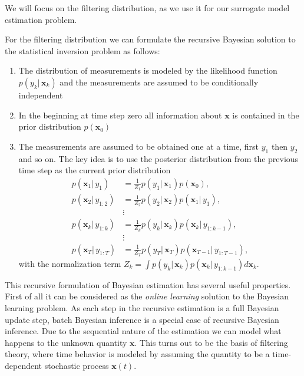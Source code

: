 
We will focus on the filtering distribution,
as we use it for our surrogate model estimation problem.

For the filtering distribution we can formulate the recursive Bayesian
solution to the statistical inversion problem as follows:
\begin{enumerate}
\item The distribution of measurements is modeled by the likelihood
  function $p(y_k |\, \mathbf{x}_k)$ and the measurements are assumed
  to be conditionally independent
\item In the beginning at time step zero all information about $\mathbf{x}$
  is contained in the prior distribution $p(\mathbf{x}_0)$
\item The measurements are assumed to be obtained one at a time,
  first $y_1$ then $y_2$ and so on. The key idea is to use the posterior
  distribution from the previous time step as the current prior
  distribution
  \begin{align*}
    p(\mathbf{x}_1 |\, y_{1})
    &= \frac{1}{Z_1} p(y_1 |\, \mathbf{x}_1) p(\mathbf{x}_0), \\
    p(\mathbf{x}_2 |\, y_{1:2})
    &= \frac{1}{Z_2} p(y_2 |\, \mathbf{x}_2) p(\mathbf{x}_1 |\, y_1), \\
                            &\vdots \\
    p(\mathbf{x}_k |\, y_{1:k})
    &= \frac{1}{Z_k} p(y_k |\, \mathbf{x}_k) p(\mathbf{x}_k |\, y_{1:k-1}), \\
                            &\vdots \\
    p(\mathbf{x}_T |\, y_{1:T})
    &= \frac{1}{Z_T} p(y_T |\, \mathbf{x}_T) p(\mathbf{x}_{T-1} |\, y_{1:T-1}),
  \end{align*}
  with the normalization term $Z_k = \int p(y_k |\, \mathbf{x}_k)
  p(\mathbf{x}_k |\, y_{1:k-1})
  d \mathbf{x}_k$. 
\end{enumerate}

This recursive formulation of Bayesian estimation has several useful
properties. First of all it can be considered as the
\textit{online learning} solution to the Bayesian learning problem.
As each step in the recursive estimation is a full Bayesian update step,
batch Bayesian inference is a special case of recursive Bayesian
inference. Due to the sequential nature of the estimation we can model
what happens to the unknown quantity $\mathbf{x}$. This turns out
to be the basis of filtering theory, where time behavior is modeled
by assuming the quantity to be a time-dependent stochastic process
$\mathbf{x}(t)$.

